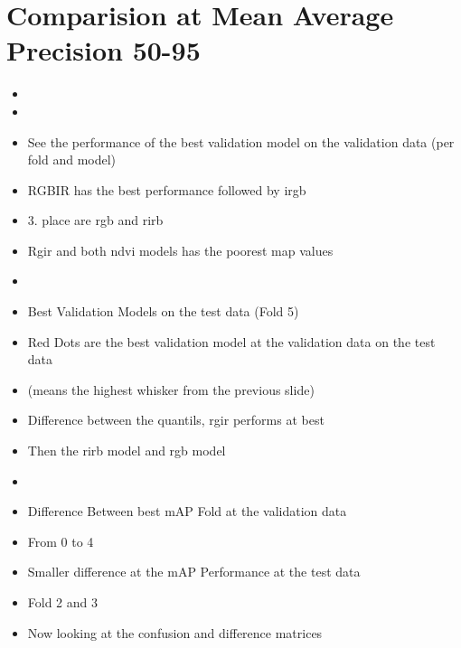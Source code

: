 \section{Comparision at Mean Average Precision 50-95}
\begin{itemize}
    \item {}
    \item {}
    \item See the performance of the best validation model on the validation data (per fold and model)
    \item RGBIR has the best performance followed by irgb 
    \item 3. place are rgb and rirb
    \item Rgir and both ndvi models has the poorest map values
\end{itemize}

\begin{itemize}
    \item {}
    \item Best Validation Models on the test data (Fold 5)
    \item Red Dots are the best validation model at the validation data on the test data
    \item (means the highest whisker from the previous slide)
    \item Difference between the quantils, rgir performs at best
    \item Then the rirb model and rgb model 
\end{itemize}

\begin{itemize}
    \item {}
    \item Difference Between best mAP Fold at the validation data
    \item From 0 to 4
    \item Smaller difference at the mAP Performance at the test data
    \item Fold 2 and 3
    \item Now looking at the confusion and difference matrices
\end{itemize}



